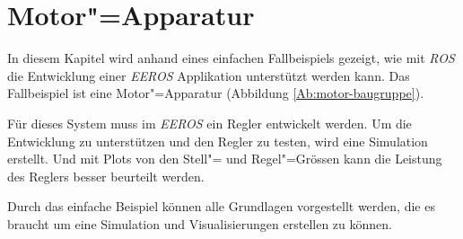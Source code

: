 \chapter{Motor"=Apparatur}
\label{chap:motor}


In diesem Kapitel wird anhand eines einfachen Fallbeispiels gezeigt, wie mit \textit{ROS} die Entwicklung einer \textit{EEROS} Applikation unterstützt werden kann. 
Das Fallbeispiel ist eine Motor"=Apparatur (Abbildung \ref{Ab:motor-baugruppe}).

Für dieses System muss im \textit{EEROS} ein Regler entwickelt werden.
Um die Entwicklung zu unterstützen und den Regler zu testen, wird eine Simulation erstellt.
Und mit Plots von den Stell"= und Regel"=Grössen kann die Leistung des Reglers besser beurteilt werden.


Durch das einfache Beispiel können alle Grundlagen vorgestellt werden, die es braucht um eine Simulation und Visualisierungen erstellen zu können.


